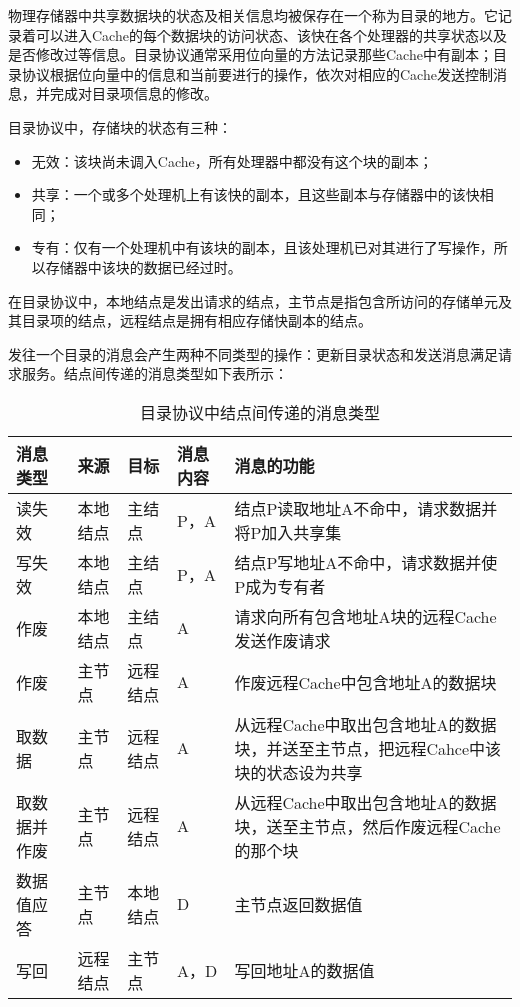 \documentclass[a4paper]{ctexart}
\begin{document}
\begin{enumerate}
  物理存储器中共享数据块的状态及相关信息均被保存在一个称为目录的地方。它记录着可以进入Cache的每个数据块的访问状态、该快在各个处理器的共享状态以及是否修改过等信息。目录协议通常采用位向量的方法记录那些Cache中有副本；目录协议根据位向量中的信息和当前要进行的操作，依次对相应的Cache发送控制消息，并完成对目录项信息的修改。
  
  目录协议中，存储块的状态有三种：
  \begin{itemize}
    \item 无效：该块尚未调入Cache，所有处理器中都没有这个块的副本；
    \item 共享：一个或多个处理机上有该快的副本，且这些副本与存储器中的该快相同；
    \item 专有：仅有一个处理机中有该块的副本，且该处理机已对其进行了写操作，所以存储器中该块的数据已经过时。
  \end{itemize}
  在目录协议中，本地结点是发出请求的结点，主节点是指包含所访问的存储单元及其目录项的结点，远程结点是拥有相应存储快副本的结点。
  
  发往一个目录的消息会产生两种不同类型的操作：更新目录状态和发送消息满足请求服务。结点间传递的消息类型如下表所示：
  \begin{table}[!htbp]
    \centering
    \caption{目录协议中结点间传递的消息类型}
    \begin{tabular}{llllp{6cm}} 
      \hline
      消息类型&来源&目标&消息内容&消息的功能 \\
      \hline
      读失效&本地结点&主结点&P，A&结点P读取地址A不命中，请求数据并将P加入共享集 \\
      \hline
      写失效&本地结点&主结点&P，A&结点P写地址A不命中，请求数据并使P成为专有者\\
      \hline
      作废&本地结点&主结点&A&请求向所有包含地址A块的远程Cache发送作废请求\\
      \hline
      作废&主节点&远程结点&A&作废远程Cache中包含地址A的数据块\\
      \hline
      取数据&主节点&远程结点&A&从远程Cache中取出包含地址A的数据块，并送至主节点，把远程Cahce中该块的状态设为共享\\
      \hline
      取数据并作废&主节点&远程结点&A&从远程Cache中取出包含地址A的数据块，送至主节点，然后作废远程Cache的那个块\\
      \hline
      数据值应答&主节点&本地结点&D&主节点返回数据值\\
      \hline
      写回&远程结点&主节点&A，D&写回地址A的数据值\\
      \hline
    \end{tabular}
  \end{table}
  

\end{enumerate}
\end{document}
